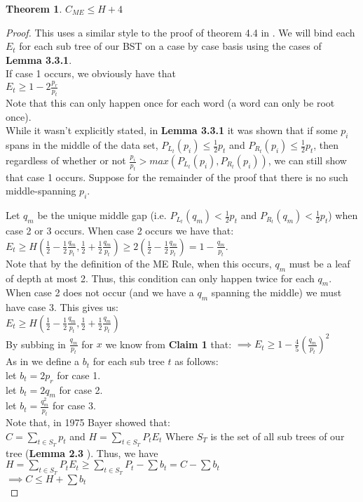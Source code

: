 \documentclass[letterpaper,12pt,titlepage,oneside,final]{book}
\theoremstyle{plain}
\newtheorem{thm}{Theorem}[section]
\begin{document}
\begin{thm}
$C_{ME} \leq H + 4$
\end{thm}

\begin{proof}
This uses a similar style to the proof of theorem 4.4 in \cite{bayer1975improved}.
We will bind each $E_t$ for each sub tree of our BST on a case by case basis using the cases of \textbf{Lemma 3.3.1}.\\
If case 1 occurs, we obviously have that \\
$E_t \geq 1-2 \frac{p_r}{p_t}$ \\
Note that this can only happen once for each word (a word can only be root once). \\

While it wasn't explicitly stated, in \textbf{Lemma 3.3.1} it was shown that if some $p_i$ spans in the middle of the data set, $P_{L_t}(p_i) \leq \frac{1}{2}p_t$ and $P_{R_t}(p_i) \leq \frac{1}{2}p_t$, then regardless of whether or not $\frac{p_i}{p_t} > max(P_{L_t}(p_i), P_{R_t}(p_i))$, we can still show that case 1 occurs. Suppose for the remainder of the proof that there is no such middle-spanning $p_i$.

Let $q_m$ be the unique middle gap (i.e. $P_{L_t}(q_m) < \frac{1}{2} p_t$ and $P_{R_t}(q_m) < \frac{1}{2} p_t$) when case 2 or 3 occurs. When case 2 occurs we have that: \\
$E_t \geq H(\frac{1}{2}-\frac{1}{2} \frac{q_m}{p_t}, \frac{1}{2} + \frac{1}{2} \frac{q_m}{p_t}) \geq 2(\frac{1}{2}-\frac{1}{2} \frac{q_m}{p_t})=1-\frac{q_m}{p_t}$. \\
Note that by the definition of the ME Rule, when this occurs, $q_m$ must be a leaf of depth at most 2. Thus, this condition can only happen twice for each $q_m$. \\

When case 2 does not occur (and we have a $q_m$ spanning the middle) we must have case 3. This gives us: \\
$E_t \geq H(\frac{1}{2}-\frac{1}{2} \frac{q_m}{p_t}, \frac{1}{2} + \frac{1}{2} \frac{q_m}{p_t})$ \\
By subbing in $\frac{q_m}{p_t}$ for $x$ we know from \textbf{Claim 1} that:
$\implies E_t \geq 1- \frac{4}{5} (\frac{q_m}{p_t})^2$\\

As in \cite{bayer1975improved} we define a $b_t$ for each sub tree $t$ as follows: \\
let $b_t=2p_r$ for case 1. \\
let $b_t=2q_m$ for case 2. \\
let $b_t=\frac{q_m^2}{p_t}$ for case 3. \\
Note that, in 1975 Bayer showed that: \\
$C = \sum_{t \in S_T} p_t$ and $H = \sum_{t \in S_T} P_t E_t $ Where $S_T$ is the set of all sub trees of our tree (\textbf{Lemma 2.3} \cite{bayer1975improved}).
Thus, we have\\
$H = \sum_{t \in S_T} P_t E_t \geq \sum_{t \in S_T} P_t - \sum b_t = C - \sum b_t$ \\
$ \implies C \leq H + \sum b_t$ \\


\end{proof}
\end{document}
